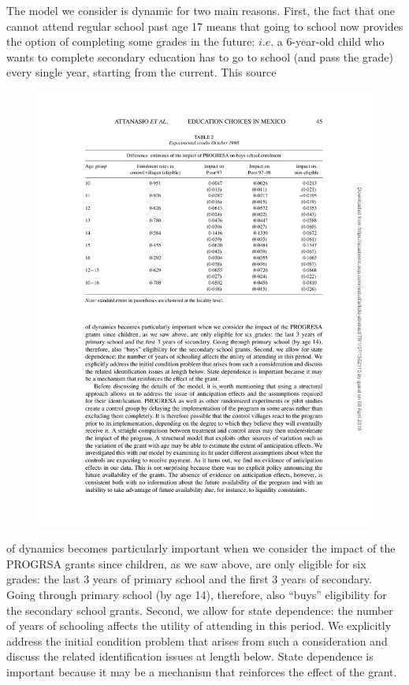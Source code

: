 \documentclass{handoutForSolutions}
\begin{document}
The model we consider is dynamic for two main reasons. First, the fact that one cannot attend regular school past age 17 means that going to school now provides the option of completing some grades in the future: $i.e$. a 6-year-old child who wants to complete secondary education has to go to school (and pass the grade) every single year, starting from the current. This source 
\begin{figure}[H]
\centering
\includegraphics[width=1\linewidth]{image/AttanasioMeghir Santiago2011Figure2.pdf}
\end{figure}
of dynamics becomes particularly important when we consider the impact of the PROGRSA grants since children, as we saw above, are only eligible for six grades: the last 3 years of primary school and the first 3 years of secondary. Going through primary school (by age 14), therefore, also ``buys'' eligibility for the secondary school grants. Second, we allow for state dependence: the number of years of schooling affects the utility of attending in this period. We explicitly address the initial condition problem that arises from such a consideration and discuss the related identification issues at length below. State dependence is important because it may be a mechanism that reinforces the effect of the grant.
\end{document}
